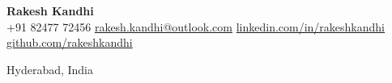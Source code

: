 \begin{center}
    {\Huge\bfseries Rakesh Kandhi}\\[2pt]

    \small
    +91 82477 72456 \quad
    \href{mailto:rakesh.kandhi@outlook.com}{rakesh.kandhi@outlook.com} \quad
    \href{https://www.linkedin.com/in/rakeshkandhi}{linkedin.com/in/rakeshkandhi} \quad
    \href{https://github.com/rakeshkandhi}{github.com/rakeshkandhi}

    Hyderabad, India
\end{center}